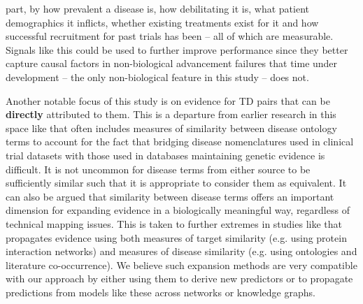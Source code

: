 \documentclass{article}
\begin{document}
part, by how prevalent a disease is, how debilitating it is, what patient demographics it inflicts, whether existing treatments exist for it and how successful recruitment for past trials has been -- all of which are measurable. Signals like this could be used to further improve performance since they better capture causal factors in non-biological advancement failures that time under development -- the only non-biological feature in this study -- does not.

Another notable focus of this study is on evidence for TD pairs that can be \textbf{directly} attributed to them. This is a departure from earlier research in this space like \cite{Nelson2015-eg} that often includes measures of similarity between disease ontology terms to account for the fact that bridging disease nomenclatures used in clinical trial datasets with those used in databases maintaining genetic evidence is difficult. It is not uncommon for disease terms from either source to be sufficiently similar such that it is appropriate to consider them as equivalent. It can also be argued that similarity between disease terms offers an important dimension for expanding evidence in a biologically meaningful way, regardless of technical mapping issues. This is taken to further extremes in studies like \cite{PMID:33262371} that propagates evidence using both measures of target similarity (e.g. using protein interaction networks) and measures of disease similarity (e.g. using ontologies and literature co-occurrence). We believe such expansion methods are very compatible with our approach by either using them to derive new predictors or to propagate predictions from models like these across networks or knowledge graphs.
\end{document}

